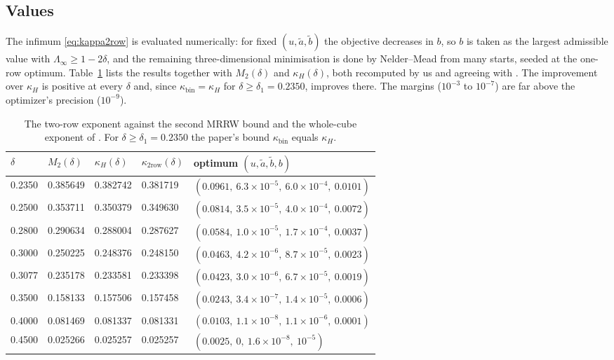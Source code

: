 \documentclass[11pt]{amsart}
\theoremstyle{definition}
\begin{document}
\subsection{Values}
The infimum \eqref{eq:kappa2row} is evaluated numerically: for fixed $(u,\tilde a,\tilde b)$ the objective decreases in $b$, so $b$ is taken as the largest admissible value with $\Lambda_\infty\ge1-2\delta$, and the remaining three-dimensional minimisation is done by Nelder--Mead from many starts, seeded at the one-row optimum. Table~\ref{tab:exp} lists the results together with $M_2(\delta)$ and $\kappa_H(\delta)$, both recomputed by us and agreeing with \cite{OAI2026}. The improvement over $\kappa_H$ is positive at every $\delta$ and, since $\kappa_{\mathrm{bin}}=\kappa_H$ for $\delta\ge\delta_1=0.2350$, improves \cite[Thm.~1.1]{OAI2026} there. The margins ($10^{-3}$ to $10^{-7}$) are far above the optimizer's precision ($10^{-9}$).

\begin{table}[ht]
\centering
\begin{tabular}{@{}lllll@{}}\toprule
$\delta$ & $M_2(\delta)$ & $\kappa_H(\delta)$ \cite{OAI2026} & $\kappa_{2\mathrm{row}}(\delta)$ & optimum $(u,\tilde a,\tilde b,b)$\\\midrule
0.2350 & 0.385649 & 0.382742 & 0.381719 & $(0.0961,\ 6.3\times10^{-5},\ 6.0\times10^{-4},\ 0.0101)$\\
0.2500 & 0.353711 & 0.350379 & 0.349630 & $(0.0814,\ 3.5\times10^{-5},\ 4.0\times10^{-4},\ 0.0072)$\\
0.2800 & 0.290634 & 0.288004 & 0.287627 & $(0.0584,\ 1.0\times10^{-5},\ 1.7\times10^{-4},\ 0.0037)$\\
0.3000 & 0.250225 & 0.248376 & 0.248150 & $(0.0463,\ 4.2\times10^{-6},\ 8.7\times10^{-5},\ 0.0023)$\\
0.3077 & 0.235178 & 0.233581 & 0.233398 & $(0.0423,\ 3.0\times10^{-6},\ 6.7\times10^{-5},\ 0.0019)$\\
0.3500 & 0.158133 & 0.157506 & 0.157458 & $(0.0243,\ 3.4\times10^{-7},\ 1.4\times10^{-5},\ 0.0006)$\\
0.4000 & 0.081469 & 0.081337 & 0.081331 & $(0.0103,\ 1.1\times10^{-8},\ 1.1\times10^{-6},\ 0.0001)$\\
0.4500 & 0.025266 & 0.025257 & 0.025257 & $(0.0025,\ 0,\ 1.6\times10^{-8},\ 10^{-5})$\\
\bottomrule
\end{tabular}
\caption{The two-row exponent against the second MRRW bound and the whole-cube exponent of \cite{OAI2026}. For $\delta\ge\delta_1=0.2350$ the paper's bound $\kappa_{\mathrm{bin}}$ equals $\kappa_H$.}\label{tab:exp}
\end{table}
\end{document}

